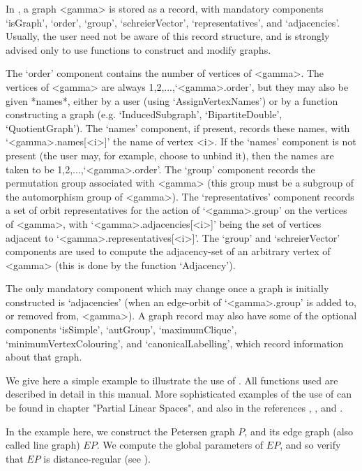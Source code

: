 In {\GRAPE}, a graph <gamma> is stored as a record, with mandatory
components `isGraph', `order', `group', `schreierVector',
`representatives', and `adjacencies'. Usually, the user need not be
aware of this record structure, and is strongly advised only to use
{\GRAPE} functions to construct and modify graphs.

The `order' component contains the number of vertices of <gamma>. The
vertices of <gamma> are always 1,2,...,`<gamma>.order', but they may also
be given *names*, either by a user (using `AssignVertexNames') or by a
function constructing a graph (e.g. `InducedSubgraph', `BipartiteDouble',
`QuotientGraph'). The `names' component, if present, records these
names, with `<gamma>.names[<i>]' the name of vertex <i>.  If the `names'
component is not present (the user may, for example, choose to unbind
it), then the names are taken to be 1,2,...,`<gamma>.order'. The `group'
component records the {\GAP} permutation group associated with <gamma>
(this group must be a subgroup of the automorphism group of <gamma>). The
`representatives' component records a set of orbit representatives
for the action of `<gamma>.group' on the vertices of <gamma>, with
`<gamma>.adjacencies[<i>]' being the set of vertices adjacent to
`<gamma>.representatives[<i>]'. The `group' and `schreierVector'
components are used to compute the adjacency-set of an arbitrary vertex
of <gamma> (this is done by the function `Adjacency').

The only mandatory component which may change once a graph is initially
constructed is `adjacencies' (when an edge-orbit of `<gamma>.group' is
added to, or removed from, <gamma>). A graph record may also have some
of the optional components `isSimple', `autGroup', `maximumClique',
`minimumVertexColouring', and `canonicalLabelling', which record
information about that graph.


We give here a simple example to illustrate the use of {\GRAPE}. All
functions used are described in detail in this manual. More
sophisticated examples of the use of {\GRAPE} can be found in
chapter "Partial Linear Spaces", and also in the references \cite{Cam99},
\cite{CSS99}, \cite{HL99} and \cite{Soi06}.

In the example here, we construct the Petersen graph $P$, and its edge
graph (also called line graph) $EP$. We compute the global parameters
of $EP$, and so verify that $EP$ is distance-regular (see \cite{BCN89}).

